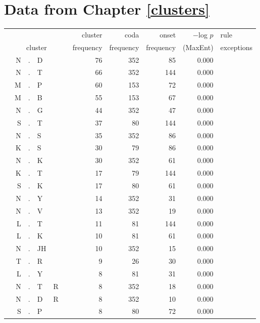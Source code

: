 \chapter{Data from Chapter \ref{clusters}}

\begin{longtable}{r@{ } r@{ } c@{ } l@{ } l@{ } l@{ } r r r r l }
\toprule
 &  &  &  &  &  &  cluster  &  coda  &  onset  &  $-$log $p$  &  rule \\
\multicolumn{6}{c}{cluster}  &  frequency  &  frequency  &  frequency  &  (MaxEnt)  &  exceptions\\ 
\midrule
  & N & . & D &   &   & 76 & 352 & 85 & 0.000 &  \\
  & N & . & T &   &   & 66 & 352 & 144 & 0.000 &  \\
  & M & . & P &   &   & 60 & 153 & 72 & 0.000 &  \\
  & M & . & B &   &   & 55 & 153 & 67 & 0.000 &  \\
  & N & . & G &   &   & 44 & 352 & 47 & 0.000 &  \\
  & S & . & T &   &   & 37 & 80 & 144 & 0.000 &  \\
  & N & . & S &   &   & 35 & 352 & 86 & 0.000 &  \\
  & K & . & S &   &   & 30 & 79 & 86 & 0.000 &  \\
  & N & . & K &   &   & 30 & 352 & 61 & 0.000 &  \\
  & K & . & T &   &   & 17 & 79 & 144 & 0.000 &  \\
  & S & . & K &   &   & 17 & 80 & 61 & 0.000 &  \\
  & N & . & Y &   &   & 14 & 352 & 31 & 0.000 &  \\
  & N & . & V &   &   & 13 & 352 & 19 & 0.000 &  \\
  & L & . & T &   &   & 11 & 81 & 144 & 0.000 &  \\
  & L & . & K &   &   & 10 & 81 & 61 & 0.000 &  \\
  & N & . & JH &   &   & 10 & 352 & 15 & 0.000 &  \\
  & T & . & R &   &   & 9 & 26 & 30 & 0.000 &  \\
  & L & . & Y &   &   & 8 & 81 & 31 & 0.000 &  \\
  & N & . & T & R &   & 8 & 352 & 18 & 0.000 &  \\
  & N & . & D & R &   & 8 & 352 & 10 & 0.000 &  \\
  & S & . & P &   &   & 8 & 80 & 72 & 0.000 &  \\

\end{longtable}
